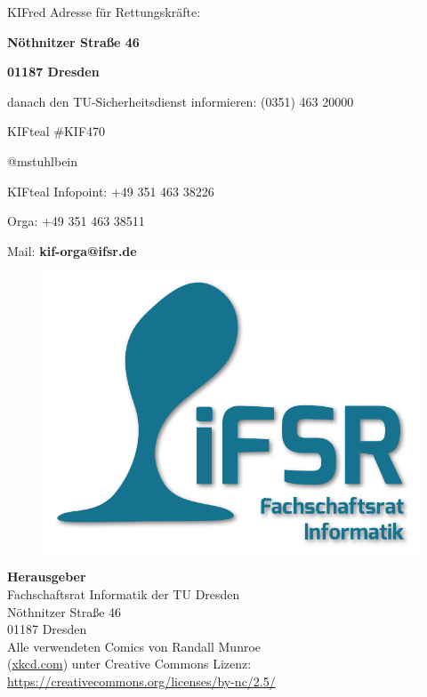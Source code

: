 \begin{awesomeblock}[KIFred]{2pt}{\faFire}{KIFred}
    Adresse für Rettungskräfte:

    \begin{center}
      \textbf{Nöthnitzer Straße 46}

      \textbf{01187 Dresden}
    \end{center}

   danach den TU-Sicherheitsdienst informieren:
   (0351) 463 20000
\end{awesomeblock}

\begin{awesomeblock}[KIFteal]{2pt}{\faTwitter}{KIFteal}
  \#KIF470

  @mstuhlbein
\end{awesomeblock}

\begin{awesomeblock}[KIFteal]{2pt}{\faInfoCircle}{KIFteal}
  Infopoint: +49 351 463 38226

  Orga: +49 351 463 38511

  Mail: \textbf{kif-orga@ifsr.de}
\end{awesomeblock}

\vfill

\setlength{\parindent}{0cm}

\begin{figure}
  \vspace*{-20pt}
  \includegraphics[width=.4\textwidth]{img/imprint}
\end{figure}

\footnotesize
\textbf{Herausgeber} \\
Fachschaftsrat Informatik der TU Dresden\\
Nöthnitzer Straße 46\\
01187 Dresden\\[1\baselineskip]

Alle verwendeten Comics von Randall Munroe\\ (\url{xkcd.com}) unter Creative Commons Lizenz:\\
\url{https://creativecommons.org/licenses/by-nc/2.5/}\\[1\baselineskip]

